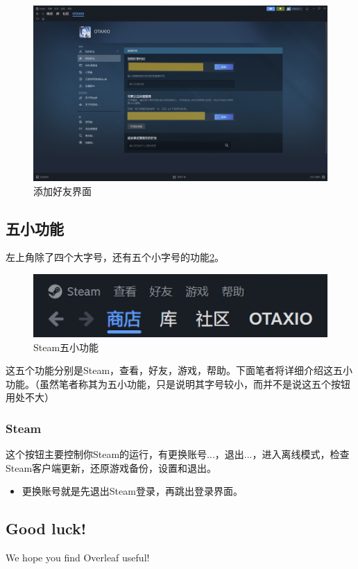 \documentclass{article}
\begin{document}
        \begin{figure}[H]
        \centering
        \includegraphics[width=0.7\linewidth]{图/添加好友.png}
        \caption{\label{fig:添加好友}添加好友界面}
        \end{figure}
    \subsection{五小功能}
    左上角除了四个大字号，还有五个小字号的功能\ref{fig:五小功能}。
    \begin{figure}[H]
    \centering
    \includegraphics[width=0.7\linewidth]{图/主要四功能.png}
    \caption{\label{fig:五小功能}Steam五小功能}
    \end{figure}
    这五个功能分别是Steam，查看，好友，游戏，帮助。下面笔者将详细介绍这五小功能。（虽然笔者称其为五小功能，只是说明其字号较小，而并不是说这五个按钮用处不大）
        \subsubsection{Steam}
        这个按钮主要控制你Steam的运行，有更换账号...，退出...，进入离线模式，检查Steam客户端更新，还原游戏备份，设置和退出。
        \begin{itemize}
            \item 更换账号就是先退出Steam登录，再跳出登录界面。
        \end{itemize}

\subsection{Good luck!}

We hope you find Overleaf useful!
\end{document}
